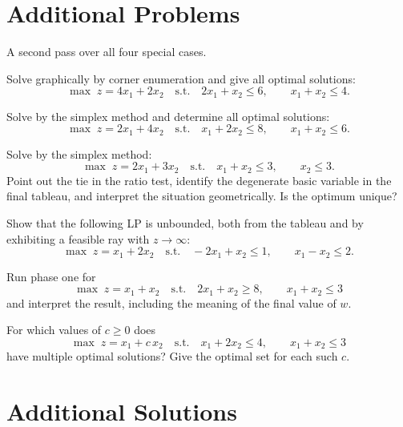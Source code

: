 \section{Additional Problems}

A second pass over all four special cases.

\begin{problems}
  \item Solve graphically by corner enumeration and give all optimal
        solutions:
        \[
          \max\; z=4x_1+2x_2
          \quad\text{s.t.}\quad
          2x_1+x_2\le 6,\qquad x_1+x_2\le 4 .
        \]

  \item Solve by the simplex method and determine all optimal solutions:
        \[
          \max\; z=2x_1+4x_2
          \quad\text{s.t.}\quad
          x_1+2x_2\le 8,\qquad x_1+x_2\le 6 .
        \]

  \item Solve by the simplex method:
        \[
          \max\; z=2x_1+3x_2
          \quad\text{s.t.}\quad
          x_1+x_2\le 3,\qquad x_2\le 3 .
        \]
        Point out the tie in the ratio test, identify the degenerate basic
        variable in the final tableau, and interpret the situation
        geometrically. Is the optimum unique?

  \item Show that the following LP is unbounded, both from the tableau and
        by exhibiting a feasible ray with $z\to\infty$:
        \[
          \max\; z=x_1+2x_2
          \quad\text{s.t.}\quad
          -2x_1+x_2\le 1,\qquad x_1-x_2\le 2 .
        \]

  \item Run phase one for
        \[
          \max\; z=x_1+x_2
          \quad\text{s.t.}\quad
          2x_1+x_2\ge 8,\qquad x_1+x_2\le 3
        \]
        and interpret the result, including the meaning of the final value
        of $w$.

  \item For which values of $c\ge 0$ does
        \[
          \max\; z=x_1+c\,x_2
          \quad\text{s.t.}\quad
          x_1+2x_2\le 4,\qquad x_1+x_2\le 3
        \]
        have multiple optimal solutions? Give the optimal set for each such
        $c$.
\end{problems}

\section{Additional Solutions}

